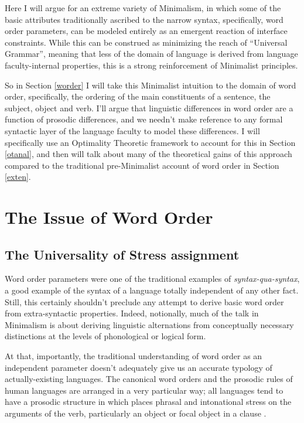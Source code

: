 \documentclass{article}
\begin{document}
Here I will argue for an extreme variety of Minimalism, in which some of the basic attributes traditionally ascribed to the narrow syntax, specifically, word order parameters, can be modeled entirely as an emergent reaction of interface constraints.
While this can be construed as minimizing the reach of ``Universal Grammar'', meaning that less of the domain of language is derived from language faculty-internal properties, this is a strong reinforcement of Minimalist principles.

So in Section \ref{worder} I will take this Minimalist intuition to the domain of word order, specifically, the ordering of the main constituents of a sentence, the subject, object and verb.
I'll argue that linguistic differences in word order are a function of prosodic differences, and we needn't make reference to any formal syntactic layer of the language faculty to model these differences.
I will specifically use an Optimality Theoretic framework to account for this in Section \ref{otanal}, and then will talk about many of the theoretical gains of this approach compared to the traditional pre-Minimalist account of word order in Section \ref{exten}.

\section{The Issue of Word Order\label{worder}}

\subsection{The Universality of Stress assignment}

Word order parameters were one of the traditional examples of \textit{syntax-qua-syntax}, a good example of the syntax of a language totally independent of any other fact.
Still, this certainly shouldn't preclude any attempt to derive basic word order from extra-syntactic properties.  
Indeed, notionally, much of the talk in Minimalism is about deriving linguistic alternations from conceptually necessary distinctions at the levels of phonological or logical form.

At that, importantly, the traditional understanding of word order as an independent parameter doesn't adequately give us an accurate typology of actually-existing languages.
The canonical word orders and the prosodic rules of human languages are arranged in a very particular way; all languages tend to have a prosodic structure in which places phrasal and intonational stress on the arguments of the verb, particularly an object or focal object in a clause \parencite{gundel88}.
\end{document}
